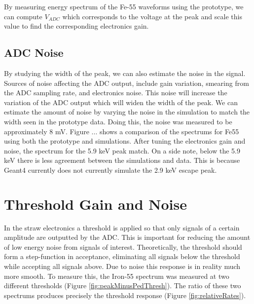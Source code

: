 By measuring energy spectrum of the Fe-55 waveforms using the prototype, we can compute $V_{ADC}$ which corresponds to the voltage at the peak and scale this value to find the corresponding electronics gain.

\subsection{ADC Noise}

By studying the width of the peak, we can also estimate the noise in the signal. Sources of noise affecting the ADC output, include gain variation, smearing from the ADC sampling rate, and electronics noise. This noise will increase the variation of the ADC output which will widen the width of the peak. We can estimate the amount of noise by varying the noise in the simulation to match the width seen in the prototype data. Doing this, the noise was measured to be approximately 8 mV. Figure ... shows a comparison of the spectrums for Fe55 using both the prototype and simulations. After tuning the electronics gain and noise, the spectrum for the 5.9 keV peak match. On a side note, below the 5.9 keV there is less agreement between the simulations and data. This is because Geant4 currently does not currently simulate the 2.9 keV escape peak.

\section{Threshold Gain and Noise}

In the straw electronics a threshold is applied so that only signals of a certain amplitude are outputted by the ADC. This is important for reducing the amount of low energy noise from signals of interest. Theoretically, the threshold should form a step-function in acceptance, eliminating all signals below the threshold while accepting all signals above. Due to noise this response is in reality much more smooth. To measure this, the Iron-55 spectrum was measured at two different thresholds (Figure \ref{fig:peakMinusPedThresh}). The ratio of these two spectrums produces precisely the threshold response (Figure \ref{fig:relativeRates}).


